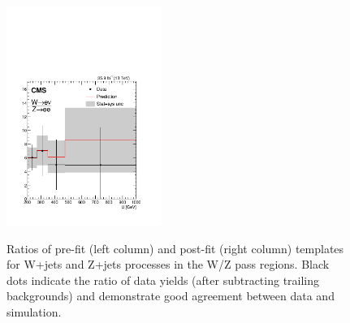 \begin{figure}
\includegraphics[width=0.45\textwidth]{figures/pullsImpact/ratio_wen_zee_shapes_fit_b.pdf}\\
\caption{Ratios of pre-fit (left column) and post-fit (right column) templates for W+jets and Z+jets processes in the W/Z pass regions. Black dots indicate the ratio of data yields (after subtracting trailing backgrounds) and demonstrate good agreement between data and simulation.}
\label{wzratios2}
\end{figure}

\clearpage

